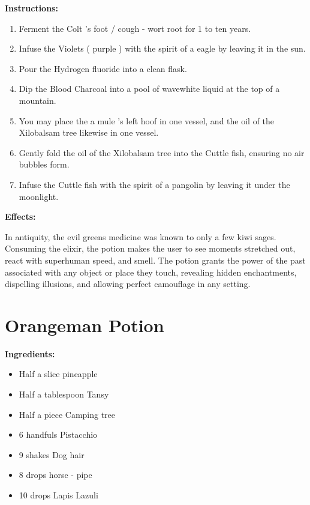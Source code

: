 \documentclass{article}
\begin{document}
\textbf{Instructions:}

\begin{enumerate}
  \item Ferment the Colt 's foot / cough - wort root for 1 to ten years.
  \item Infuse the Violets ( purple ) with the spirit of a eagle by leaving it in the sun.
  \item Pour the Hydrogen fluoride into a clean flask.
  \item Dip the Blood Charcoal into a pool of wavewhite liquid at the top of a mountain.
  \item You may place the a mule 's left hoof in one vessel, and the oil of the Xilobalsam tree likewise in one vessel.
  \item Gently fold the oil of the Xilobalsam tree into the Cuttle fish, ensuring no air bubbles form.
  \item Infuse the Cuttle fish with the spirit of a pangolin by leaving it under the moonlight.
\end{enumerate}

\textbf{Effects:}

In antiquity, the evil greens medicine was known to only a few kiwi sages. Consuming the elixir, the potion makes the user to see moments stretched out, react with superhuman speed, and smell. The potion grants the power of the past associated with any object or place they touch, revealing hidden enchantments, dispelling illusions, and allowing perfect camouflage in any setting.

\newpage
\section*{Orangeman Potion}

\textbf{Ingredients:}

\begin{itemize}
  \item Half a slice pineapple
  \item Half a tablespoon Tansy
  \item Half a piece Camping tree
  \item 6 handfuls Pistacchio
  \item 9 shakes Dog hair
  \item 8 drops horse - pipe
  \item 10 drops Lapis Lazuli
\end{itemize}
\end{document}
